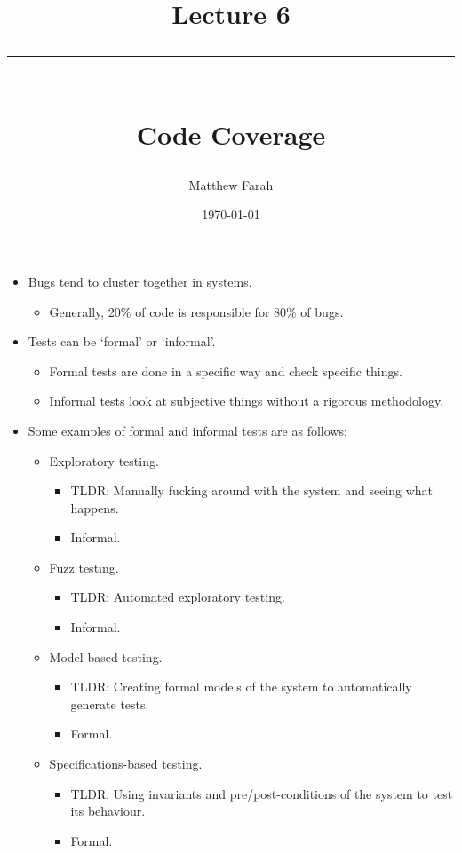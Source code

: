 \documentclass{article}
\date{
	\vspace{-.75em}
	{\large \today}
}
\title{
	\vspace*{-1.5em}
	{\Huge Lecture 6} \\
	\vspace{-1em}
	\rule{\textwidth/4}{.01em} \\
	\vspace{-.25em}
	{\Large Code Coverage}
	\vspace{-.75em}
}
\author{
	{\large Matthew Farah}
}
\begin{document}
\maketitle
\pagestyle{fancy}

\fi

\begin{itemize}
	\item Bugs tend to cluster together in systems.
	\begin{itemize}
		\item Generally, 20\% of code is responsible for 80\% of bugs.
	\end{itemize}
	\item Tests can be `formal' or `informal'.
	\begin{itemize}
		\item Formal tests are done in a specific way and check specific things.
		\item Informal tests look at subjective things without a rigorous methodology.
	\end{itemize}
	\item Some examples of formal and informal tests are as follows:
	\begin{itemize}
		\item Exploratory testing.
		\begin{itemize}
			\item TLDR; Manually fucking around with the system and seeing what happens.
			\item Informal.
		\end{itemize}
		\item Fuzz testing.
		\begin{itemize}
			\item TLDR; Automated exploratory testing.
			\item Informal.
		\end{itemize}
		\item Model-based testing.
		\begin{itemize}
			\item TLDR; Creating formal models of the system to automatically generate tests.
			\item Formal.
		\end{itemize}
		\item Specifications-based testing.
		\begin{itemize}
			\item TLDR; Using invariants and pre/post-conditions of the system to test its behaviour.
			\item Formal.

\end{itemize}
\end{itemize}
\end{itemize}
\end{document}
